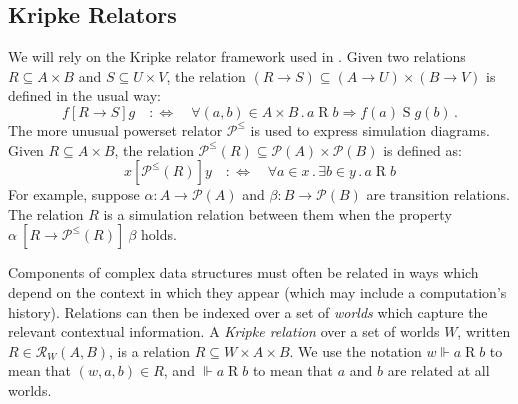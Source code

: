 \documentclass[acmsmall,screen,review,anonymous]{acmart}
\newcommand{\kw}[1]{\ensuremath{ \mathsf{#1} }}
\newcommand{\ifr}[1]{\mathrel{[{#1}]}}
\begin{document}


\subsection{Kripke Relators} %

We will rely on the Kripke relator framework
used in \citet{compcerto}.
Given two relations
$R \subseteq A \times B$ and
$S \subseteq U \times V$,
the relation
$(R \rightarrow S) \subseteq
 (A \rightarrow U) \times
 (B \rightarrow V)$
is defined in the usual way:
\[
  f \ifr{R \rightarrow S} g
  \quad:\Leftrightarrow\quad
  \forall (a, b) \in A \times B \mathbin.
    a \mathrel{R} b \Rightarrow
    f(a) \mathrel{S} g(b)
  \,.
\]
The more unusual powerset relator $\mathcal{P}^\le$
is used to express simulation diagrams.
Given $R \subseteq A \times B$,
the relation
$\mathcal{P}^\le(R) \subseteq \mathcal{P}(A) \times \mathcal{P}(B)$
is defined as:
\[
  x \ifr{\mathcal{P}^\le(R)} y
  \quad:\Leftrightarrow\quad
  \forall a \in x \mathbin.
  \exists b \in y \mathbin.
  a \mathrel{R} b
\]
For example,
suppose
$\alpha : A \rightarrow \mathcal{P}(A)$
and
$\beta : B \rightarrow \mathcal{P}(B)$
are transition relations.
The relation $R$ is a simulation relation between them
when the property
$
  \alpha \:\ifr{R \rightarrow \mathcal{P}^\le(R)}\: \beta
$
holds.

Components of complex data structures
must often be related in ways which depend
on the context in which they appear
(which may include a computation's history).
Relations can then be indexed over a set of \emph{worlds}
which capture the relevant contextual information.
A \emph{Kripke relation} over a set of worlds $W$,
written $R \in \mathcal{R}_W(A, B)$,
is a relation $R \subseteq W \times A \times B$.
We use the notation
$
  w \Vdash a \mathrel{R} b
$
to mean that $(w, a, b) \in R$,
and
$\Vdash a \mathrel{R} b$
to mean that $a$ and $b$ are related at all worlds.
\end{document}
